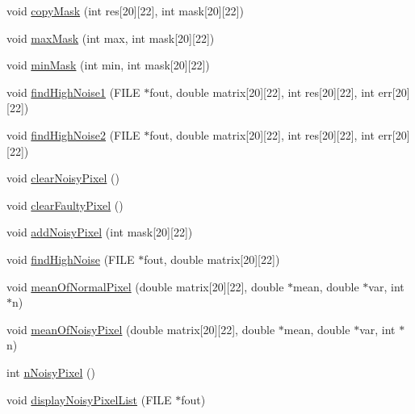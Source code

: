 \begin{DoxyCompactItemize}
\item 
void \hyperlink{classanalyseMatrix_ae42ccc44ff5a297121c7e73a6b4eadbf}{copy\-Mask} (int res\mbox{[}20\mbox{]}\mbox{[}22\mbox{]}, int mask\mbox{[}20\mbox{]}\mbox{[}22\mbox{]})
\item 
void \hyperlink{classanalyseMatrix_a4820924cab97d5a6bce8a66766b8a4f5}{max\-Mask} (int max, int mask\mbox{[}20\mbox{]}\mbox{[}22\mbox{]})
\item 
void \hyperlink{classanalyseMatrix_abfe8bf706868c42cfb8cf2dac9c2d0d4}{min\-Mask} (int min, int mask\mbox{[}20\mbox{]}\mbox{[}22\mbox{]})
\item 
void \hyperlink{classanalyseMatrix_a8f3afe9804ef7e5a15b805a7742faecc}{find\-High\-Noise1} (F\-I\-L\-E $\ast$fout, double matrix\mbox{[}20\mbox{]}\mbox{[}22\mbox{]}, int res\mbox{[}20\mbox{]}\mbox{[}22\mbox{]}, int err\mbox{[}20\mbox{]}\mbox{[}22\mbox{]})
\item 
void \hyperlink{classanalyseMatrix_a81f17c9773ff663a24095af3a8a8700b}{find\-High\-Noise2} (F\-I\-L\-E $\ast$fout, double matrix\mbox{[}20\mbox{]}\mbox{[}22\mbox{]}, int res\mbox{[}20\mbox{]}\mbox{[}22\mbox{]}, int err\mbox{[}20\mbox{]}\mbox{[}22\mbox{]})
\item 
void \hyperlink{classanalyseMatrix_a53f84ec658a8a2826ef26876091706a0}{clear\-Noisy\-Pixel} ()
\item 
void \hyperlink{classanalyseMatrix_a74d13c1dffb2d2795b583db6b88026e9}{clear\-Faulty\-Pixel} ()
\item 
void \hyperlink{classanalyseMatrix_a0f00e198a9f2005d6a6ca5f4fe70fda2}{add\-Noisy\-Pixel} (int mask\mbox{[}20\mbox{]}\mbox{[}22\mbox{]})
\item 
void \hyperlink{classanalyseMatrix_abc6c434b1e9c2dccebf7380b2237cd14}{find\-High\-Noise} (F\-I\-L\-E $\ast$fout, double matrix\mbox{[}20\mbox{]}\mbox{[}22\mbox{]})
\item 
void \hyperlink{classanalyseMatrix_a4b69db0536063f67fd7ed635953d08b4}{mean\-Of\-Normal\-Pixel} (double matrix\mbox{[}20\mbox{]}\mbox{[}22\mbox{]}, double $\ast$mean, double $\ast$var, int $\ast$n)
\item 
void \hyperlink{classanalyseMatrix_af32477590ff3d201d3d9ab3faed270a2}{mean\-Of\-Noisy\-Pixel} (double matrix\mbox{[}20\mbox{]}\mbox{[}22\mbox{]}, double $\ast$mean, double $\ast$var, int $\ast$n)
\item 
int \hyperlink{classanalyseMatrix_a9db1346d6a0601e0863961dddd310508}{n\-Noisy\-Pixel} ()
\item 
void \hyperlink{classanalyseMatrix_a953d8a856b95876b5f7e90e25063310b}{display\-Noisy\-Pixel\-List} (F\-I\-L\-E $\ast$fout)
\end{DoxyCompactItemize}
